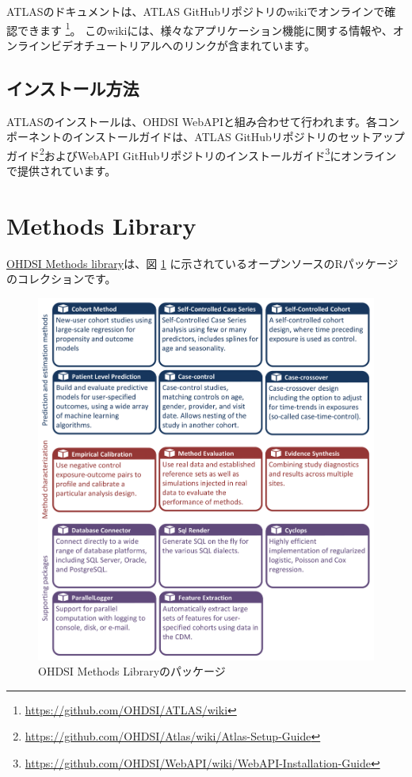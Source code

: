 \documentclass[
  11pt]{book}
\theoremstyle{definition}
\theoremstyle{definition}
\theoremstyle{definition}
\theoremstyle{definition}
\theoremstyle{remark}
\begin{document}
ATLASのドキュメントは、ATLAS GitHubリポジトリのwikiでオンラインで確認できます \footnote{\url{https://github.com/OHDSI/ATLAS/wiki}}。 このwikiには、様々なアプリケーション機能に関する情報や、オンラインビデオチュートリアルへのリンクが含まれています。 

\subsection{インストール方法}\label{ux30a4ux30f3ux30b9ux30c8ux30fcux30ebux65b9ux6cd5}

ATLASのインストールは、OHDSI WebAPIと組み合わせて行われます。各コンポーネントのインストールガイドは、ATLAS GitHubリポジトリのセットアップガイド\footnote{\url{https://github.com/OHDSI/Atlas/wiki/Atlas-Setup-Guide}}およびWebAPI GitHubリポジトリのインストールガイド\footnote{\url{https://github.com/OHDSI/WebAPI/wiki/WebAPI-Installation-Guide}}にオンラインで提供されています。 

\section{Methods Library}\label{methods-library}

\href{https://ohdsi.github.io/MethodsLibrary/}{OHDSI Methods library}は、図 \ref{fig:methodsLibrary} に示されているオープンソースのRパッケージのコレクションです。 

\begin{figure}

{\centering \includegraphics[width=1\linewidth]{images/OhdsiAnalyticsTools/methodsLibrary} 

}

\caption{OHDSI Methods Libraryのパッケージ}\label{fig:methodsLibrary}
\end{figure}
\end{document}
